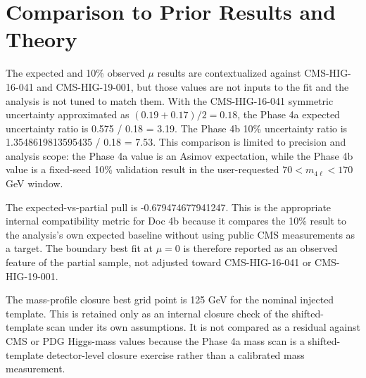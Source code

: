 \documentclass[11pt]{article}
\begin{document}
\section{Comparison to Prior Results and Theory}
The expected and 10\% observed $\mu$ results are contextualized against CMS-HIG-16-041 and CMS-HIG-19-001, but those values are not inputs to the fit and the analysis is not tuned to match them. With the CMS-HIG-16-041 symmetric uncertainty approximated as $(0.19+0.17)/2=0.18$, the Phase 4a expected uncertainty ratio is 0.575 / 0.18 = 3.19. The Phase 4b 10\% uncertainty ratio is 1.3548619813595435 / 0.18 = 7.53. This comparison is limited to precision and analysis scope: the Phase 4a value is an Asimov expectation, while the Phase 4b value is a fixed-seed 10\% validation result in the user-requested $70 < m_{4\ell} < 170$ GeV window.

The expected-vs-partial pull is -0.679474677941247. This is the appropriate internal compatibility metric for Doc 4b because it compares the 10\% result to the analysis's own expected baseline without using public CMS measurements as a target. The boundary best fit at $\mu=0$ is therefore reported as an observed feature of the partial sample, not adjusted toward CMS-HIG-16-041 or CMS-HIG-19-001.

The mass-profile closure best grid point is 125 GeV for the nominal injected template. This is retained only as an internal closure check of the shifted-template scan under its own assumptions. It is not compared as a residual against CMS or PDG Higgs-mass values because the Phase 4a mass scan is a shifted-template detector-level closure exercise rather than a calibrated mass measurement.
\end{document}

